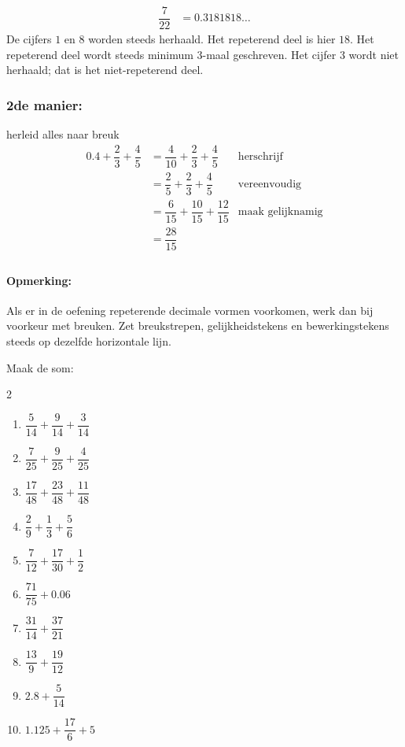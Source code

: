 \documentclass{bis}
\begin{document}
\begin{voorbeeld}
\begin{align*}
  \dfrac{7}{22} &= 0.3181818\ldots
\end{align*}
De cijfers $1$ en $8$ worden steeds herhaald. Het repeterend deel is hier $18$.
Het repeterend deel wordt steeds minimum 3-maal geschreven.
Het cijfer $3$ wordt niet herhaald; dat is het niet-repeterend deel.
\end{voorbeeld}

\subsubsection*{2de manier:}
herleid alles naar breuk
\begin{align*}
  0.4 + \dfrac{2}{3} + \dfrac{4}{5} &= \dfrac{4}{10} + \dfrac{2}{3} + \dfrac{4}{5} & \text{herschrijf}\\
                                    &= \dfrac{2}{5} + \dfrac{2}{3} + \dfrac{4}{5} & \text{vereenvoudig}\\
                                    &= \dfrac{6}{15} + \dfrac{10}{15} + \dfrac{12}{15} & \text{maak gelijknamig}\\
                                    &= \dfrac{28}{15}\\
\end{align*}

\paragraph*{Opmerking:} Als er in de oefening repeterende decimale vormen voorkomen, werk dan bij voorkeur met breuken.
Zet breukstrepen, gelijkheidstekens en bewerkingstekens steeds op dezelfde horizontale lijn.

\begin{exercise}
Maak de som:
\begin{multicols}{2}
  \begin{enumerate}
    \item $\dfrac{5}{14}+\dfrac{9}{14}+\dfrac{3}{14}$
    \item $\dfrac{7}{25}+\dfrac{9}{25}+\dfrac{4}{25}$
    \item $\dfrac{17}{48}+\dfrac{23}{48}+\dfrac{11}{48}$
    \item $\dfrac{2}{9}+\dfrac{1}{3}+\dfrac{5}{6}$
    \item $\dfrac{7}{12}+\dfrac{17}{30}+\dfrac{1}{2}$
    \item $\dfrac{71}{75}+0.06$
    \item $\dfrac{31}{14}+\dfrac{37}{21}$
    \item $\dfrac{13}{9}+\dfrac{19}{12}$
    \item $2.8+\dfrac{5}{14}$
    \item $1.125+\dfrac{17}{6}+5$
  \end{enumerate}
\end{multicols}
\end{exercise}
\end{document}
